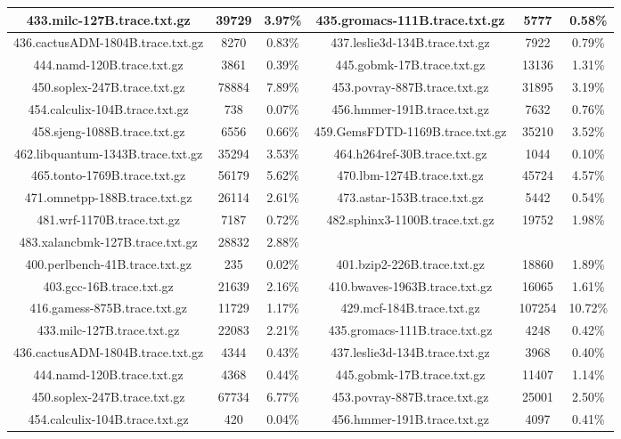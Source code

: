 \begin{table}[H]
\begin{tabular}{|c|c|c|c|c|c|}
433.milc-127B.trace.txt.gz & 39729 & 3.97\% & 435.gromacs-111B.trace.txt.gz & 5777 & 0.58\% \\\hline
436.cactusADM-1804B.trace.txt.gz & 8270 & 0.83\% & 437.leslie3d-134B.trace.txt.gz & 7922 & 0.79\% \\\hline
444.namd-120B.trace.txt.gz & 3861 & 0.39\% & 445.gobmk-17B.trace.txt.gz & 13136 & 1.31\% \\\hline
450.soplex-247B.trace.txt.gz & 78884 & 7.89\% & 453.povray-887B.trace.txt.gz & 31895 & 3.19\% \\\hline
454.calculix-104B.trace.txt.gz & 738 & 0.07\% & 456.hmmer-191B.trace.txt.gz & 7632 & 0.76\% \\\hline
458.sjeng-1088B.trace.txt.gz & 6556 & 0.66\% & 459.GemsFDTD-1169B.trace.txt.gz & 35210 & 3.52\% \\\hline
462.libquantum-1343B.trace.txt.gz & 35294 & 3.53\% & 464.h264ref-30B.trace.txt.gz & 1044 & 0.10\% \\\hline
465.tonto-1769B.trace.txt.gz & 56179 & 5.62\% & 470.lbm-1274B.trace.txt.gz & 45724 & 4.57\% \\\hline
471.omnetpp-188B.trace.txt.gz & 26114 & 2.61\% & 473.astar-153B.trace.txt.gz & 5442 & 0.54\% \\\hline
481.wrf-1170B.trace.txt.gz & 7187 & 0.72\% & 482.sphinx3-1100B.trace.txt.gz & 19752 & 1.98\% \\\hline
483.xalancbmk-127B.trace.txt.gz & 28832 & 2.88\% & & & &  \\\hline
400.perlbench-41B.trace.txt.gz & 235 & 0.02\% & 401.bzip2-226B.trace.txt.gz & 18860 & 1.89\% \\\hline
403.gcc-16B.trace.txt.gz & 21639 & 2.16\% & 410.bwaves-1963B.trace.txt.gz & 16065 & 1.61\% \\\hline
416.gamess-875B.trace.txt.gz & 11729 & 1.17\% & 429.mcf-184B.trace.txt.gz & 107254 & 10.72\% \\\hline
433.milc-127B.trace.txt.gz & 22083 & 2.21\% & 435.gromacs-111B.trace.txt.gz & 4248 & 0.42\% \\\hline
436.cactusADM-1804B.trace.txt.gz & 4344 & 0.43\% & 437.leslie3d-134B.trace.txt.gz & 3968 & 0.40\% \\\hline
444.namd-120B.trace.txt.gz & 4368 & 0.44\% & 445.gobmk-17B.trace.txt.gz & 11407 & 1.14\% \\\hline
450.soplex-247B.trace.txt.gz & 67734 & 6.77\% & 453.povray-887B.trace.txt.gz & 25001 & 2.50\% \\\hline
454.calculix-104B.trace.txt.gz & 420 & 0.04\% & 456.hmmer-191B.trace.txt.gz & 4097 & 0.41\% \\\hline

\end{tabular}
\end{table}
